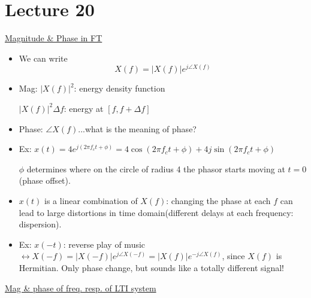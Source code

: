\documentclass{article}
\begin{document}
\section{Lecture 20}
\underline{Magnitude \& Phase in FT}
\begin{itemize}
    \item We can write
    \[X(f)=|X(f)|e^{j\angle X(f)}\]
    \item Mag: $|X(f)|^2$: energy density function
    
    $|X(f)|^2\Delta f$: energy at $[f, f+\Delta f]$
    \item Phase: $\angle X(f)$...what is the meaning of phase?
    \item Ex: $x(t)=4e^{j(2\pi f_ct+\phi)}=4\cos{(2\pi f_ct+\phi)}+4j\sin{(2\pi f_ct+\phi)}$
    
    $\phi$ determines where on the circle of radius 4 the phasor starts moving at $t=0$(phase offset).
    
    \item $x(t)$ is a linear combination of $X(f)$: changing the phase at each $f$ can lead to large distortions in time domain(different delays at each frequency: dispersion).
    
    \item Ex: $x(-t)$: reverse play of music $\leftrightarrow X(-f)=|X(-f)|e^{j\angle X(-f)}=|X(f)|e^{-j\angle X(f)}$, since $X(f)$ is Hermitian. Only phase change, but sounds like a totally different signal!
\end{itemize}
\underline{Mag \& phase of freq. resp. of LTI system}
\end{document}
